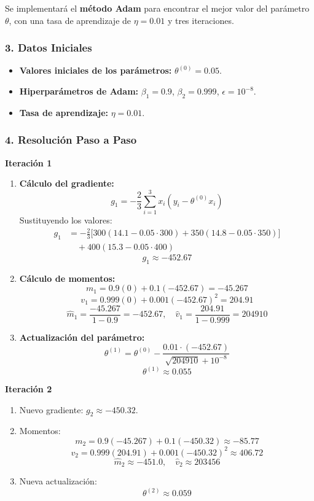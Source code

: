 \documentclass{article}
\begin{document}
Se implementará el \textbf{método Adam} para encontrar el mejor valor del parámetro \( \theta \), con una tasa de aprendizaje de \( \eta = 0.01 \) y tres iteraciones.

\subsubsection*{3. Datos Iniciales}

\begin{itemize}
	\item \textbf{Valores iniciales de los parámetros:} \( \theta^{(0)} = 0.05 \).
	\item \textbf{Hiperparámetros de Adam:} \( \beta_1 = 0.9 \), \( \beta_2 = 0.999 \), \( \epsilon = 10^{-8} \).
	\item \textbf{Tasa de aprendizaje:} \( \eta = 0.01 \).
\end{itemize}

\subsubsection*{4. Resolución Paso a Paso}

\textbf{Iteración 1}

\begin{enumerate}
	\item \textbf{Cálculo del gradiente:}
	\[
	g_1 = -\frac{2}{3} \sum_{i=1}^{3} x_i (y_i - \theta^{(0)} x_i)
	\]
	Sustituyendo los valores:
	\begin{align*}
		g_1 &= -\frac{2}{3} \Bigg[ 300(14.1 - 0.05 \cdot 300) + 350(14.8 - 0.05 \cdot 350) \Bigg] \\
		&\quad + 400(15.3 - 0.05 \cdot 400)
	\end{align*}	
	\[
	g_1 \approx -452.67
	\]
	
	\item \textbf{Cálculo de momentos:}
	\[
	m_1 = 0.9(0) + 0.1(-452.67) = -45.267
	\]
	\[
	v_1 = 0.999(0) + 0.001(-452.67)^2 = 204.91
	\]
	\[
	\hat{m}_1 = \frac{-45.267}{1 - 0.9} = -452.67, \quad \hat{v}_1 = \frac{204.91}{1 - 0.999} = 204910
	\]
	
	\item \textbf{Actualización del parámetro:}
	\[
	\theta^{(1)} = \theta^{(0)} - \frac{0.01 \cdot (-452.67)}{\sqrt{204910} + 10^{-8}}
	\]
	\[
	\theta^{(1)} \approx 0.055
	\]
\end{enumerate}

\textbf{Iteración 2}

\begin{enumerate}
	\item Nuevo gradiente: \( g_2 \approx -450.32 \).
	\item Momentos:
	\[
	m_2 = 0.9(-45.267) + 0.1(-450.32) \approx -85.77
	\]
	\[
	v_2 = 0.999(204.91) + 0.001(-450.32)^2 \approx 406.72
	\]
	\[
	\hat{m}_2 \approx -451.0, \quad \hat{v}_2 \approx 203456
	\]
	
	\item Nueva actualización:
	\[
	\theta^{(2)} \approx 0.059
	\]
\end{enumerate}
\end{document}
